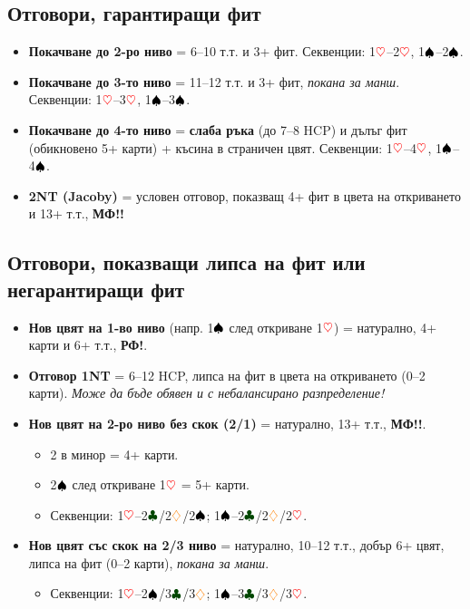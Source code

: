 \documentclass[10pt,a5paper]{extarticle}
\newcommand{\Rheart}{\textcolor{red}{\heartsuit}}
\newcommand{\Rdiamond}{\textcolor{orange}{\diamondsuit}}
\newcommand{\Bspade}{\textcolor{black}{\spadesuit}}
\newcommand{\Bclub}{\textcolor{darkgreen}{\clubsuit}}
\begin{document}
\subsection*{Отговори, гарантиращи фит}
\begin{itemize}
  \item[] \textbf{Покачване до 2-ро ниво} = 6–10 т.т. и 3+ фит.  
  Секвенции: 1$\Rheart$–2$\Rheart$, 1$\Bspade$–2$\Bspade$.
  \item[] \textbf{Покачване до 3-то ниво} = 11–12 т.т. и 3+ фит, \emph{покана за манш}.  
  Секвенции: 1$\Rheart$–3$\Rheart$, 1$\Bspade$–3$\Bspade$.
  \item[] \textbf{Покачване до 4-то ниво} = \textbf{слаба ръка} (до 7–8 HCP) и дълъг фит (обикновено 5+ карти) + късина в страничен цвят.  
  Секвенции: 1$\Rheart$–4$\Rheart$, 1$\Bspade$–4$\Bspade$.
  \item[] \textbf{2NT (Jacoby)} = условен отговор, показващ 4+ фит в цвета на откриването и 13+ т.т., \textbf{МФ!!}
\end{itemize}

\subsection*{Отговори, показващи липса на фит или негарантиращи фит}
\begin{itemize}
  \item[] \textbf{Нов цвят на 1-во ниво} (напр. 1$\Bspade$ след откриване 1$\Rheart$) = натурално, 4+ карти и 6+ т.т., \textbf{РФ!}.
  \item[] \textbf{Отговор 1NT} = 6–12 HCP, липса на фит в цвета на откриването (0–2 карти).  
  \emph{Може да бъде обявен и с небалансирано разпределение!}
  \item[] \textbf{Нов цвят на 2-ро ниво без скок (2/1)} = натурално, 13+ т.т., \textbf{МФ!!}.  
  \begin{itemize}
    \item[] 2 в минор = 4+ карти.  
    \item[] 2$\Bspade$ след откриване 1$\Rheart$ = 5+ карти.  
    \item[] Секвенции: 1$\Rheart$–2$\Bclub$/2$\Rdiamond$/2$\Bspade$; 1$\Bspade$–2$\Bclub$/2$\Rdiamond$/2$\Rheart$.
  \end{itemize}
  \item[] \textbf{Нов цвят със скок на 2/3 ниво} = натурално, 10–12 т.т., добър 6+ цвят, липса на фит (0–2 карти), \emph{покана за манш}.  
  \begin{itemize}
    \item[] Секвенции: 1$\Rheart$–2$\Bspade$/3$\Bclub$/3$\Rdiamond$;  
    1$\Bspade$–3$\Bclub$/3$\Rdiamond$/3$\Rheart$.
  \end{itemize}
\end{itemize}
\end{document}
